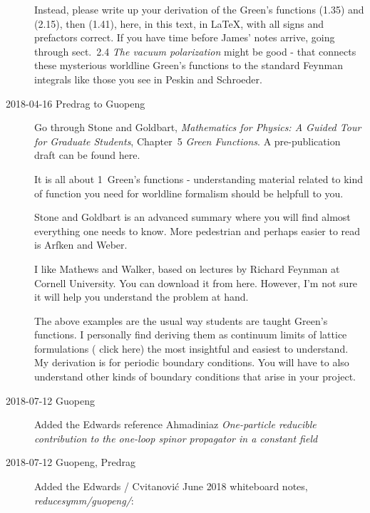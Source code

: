 \begin{description}
Instead, please write up your derivation of the Green's functions (1.35)
and (2.15), then (1.41), here, in this text, in LaTeX, with all signs and
prefactors correct. If you have time before James' notes arrive, going
through sect.~2.4 {\em The vacuum polarization} might be good - that
connects these mysterious worldline Green's functions to the standard
Feynman integrals like those you see in Peskin and Schroeder.

\item[2018-04-16 Predrag to Guopeng]
Go through
Stone and Goldbart, {\em Mathematics for Physics: A Guided Tour
for Graduate Students}, Chapter~5  \emph{Green Functions}.
A pre-publication draft can be found
{here}.

It is all about 1\dmn\ Green's functions - understanding material related to
kind of function you need for worldline formalism should be helpfull to you.

Stone and Goldbart is an advanced summary where you will find
almost everything one needs to know. More pedestrian and perhaps easier to
read is Arfken and Weber.

I like Mathews and Walker, based on lectures by Richard
Feynman at Cornell University. You can download it from
{here}. However, I'm not sure it will help you understand the problem at
hand.

The above examples are the usual way students are taught Green's functions. I
personally find deriving them as continuum limits of lattice formulations
(
{click here}) the most insightful and easiest to understand. My derivation
is for periodic boundary conditions. You will have to also understand other kinds of
boundary conditions that arise in your project.

\item[2018-07-12 Guopeng]
Added the Edwards reference
Ahmadiniaz \etal{}
{\em One-particle reducible contribution to the one-loop spinor propagator in a constant field}

\item[2018-07-12 Guopeng, Predrag]
Added the Edwards / Cvitanovi\'c June 2018 whiteboard notes, \emph{reducesymm/guopeng/}:


\end{description}
